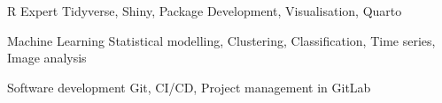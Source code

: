 
\begin{cvskills}
  \cvskill
    {R Expert} %
    {Tidyverse, Shiny, Package Development, Visualisation, Quarto} %

  \cvskill
    {Machine Learning} %
    {Statistical modelling, Clustering, Classification, Time series, Image analysis} %

  \cvskill
    {Software development} %
    {Git, CI/CD, Project management in GitLab} %

\end{cvskills}
